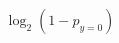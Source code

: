 \documentclass[preview]{standalone}
\begin{document}
\begin{align*}
\log_2(1-p_{y=0})
\end{align*}
\end{document}
